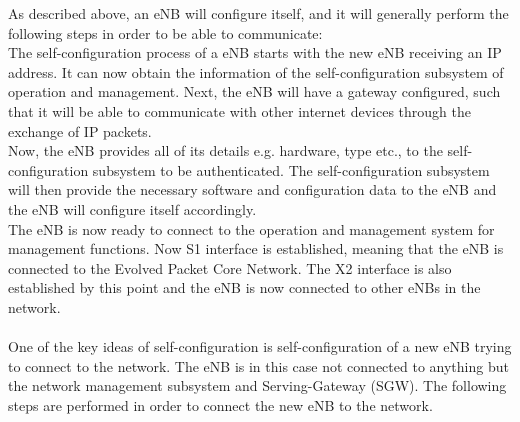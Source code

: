 \documentclass{report}
\begin{document}
As described above, an eNB will configure itself, and it will generally perform the following steps in order to be able to communicate:\\ The self-configuration process of a eNB starts with the new eNB receiving an IP address. It can now obtain the information of the self-configuration subsystem of operation and management. Next, the eNB will have a gateway configured, such that it will be able to communicate with other internet devices through the exchange of IP packets. \\
Now, the eNB provides all of its details e.g. hardware, type etc., to the self-configuration subsystem to be authenticated. The self-configuration subsystem will then provide the necessary software and configuration data to the eNB and the eNB will configure itself accordingly. \\ The eNB is now ready to connect to the operation and management system for management functions. Now S1 interface is established, meaning that the eNB is connected to the Evolved Packet Core Network. The X2 interface is also established by this point and the eNB is now connected to other eNBs in the network.\cite{Feng2008} %
\\ \\
One of the key ideas of self-configuration is self-configuration of a new eNB trying to connect to the network. The eNB is in this case not connected to anything but the network management subsystem and Serving-Gateway (SGW). The following steps are performed in order to connect the new eNB to the network. 
\end{document}
